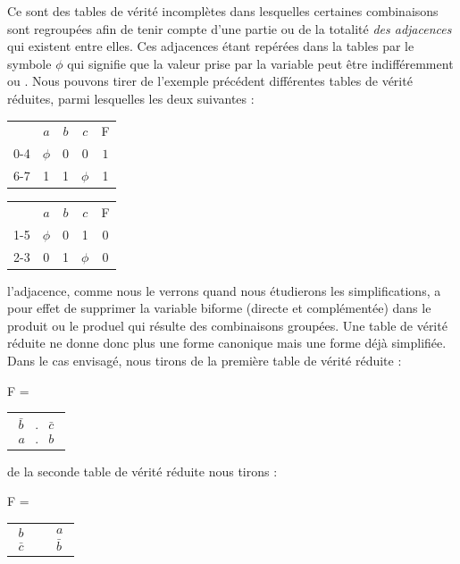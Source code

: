 \textendash{} Ce sont des tables de vérité incomplètes dans lesquelles
certaines combinaisons sont regroupées afin de tenir compte d'une
partie ou de la totalité \emph{des adjacences} qui existent entre
elles. Ces adjacences étant repérées dans la tables par le symbole
\og $\phi$ \fg{} qui signifie que la valeur prise par la variable
peut être indifféremment  \fg{} ou  \fg{}. Nous pouvons
tirer de l'exemple précédent différentes tables de vérité réduites,
parmi lesquelles les deux suivantes : 

\bigskip{}

\hspace*{1cm}%
\begin{tabular}{c|c|c|c||c|}
\cline{2-5} 
 & $a$ & $b$ & $c$ & F\tabularnewline
\cline{2-5} 
0-4 & $\phi$ & 0 & 0 & $1$\tabularnewline
6-7 & 1 & 1 & $\phi$ & 1\tabularnewline
\cline{2-5} 
\end{tabular}\hspace*{\fill}%
\begin{tabular}{c|c|c|c||c|}
\cline{2-5} 
 & $a$ & $b$ & $c$ & F\tabularnewline
\cline{2-5} 
1-5 & $\phi$ & 0 & 1 & 0\tabularnewline
2-3 & 0 & 1 & $\phi$ & 0\tabularnewline
\cline{2-5} 
\end{tabular}\hspace*{1cm}

\newpage 

l'adjacence, comme nous le verrons quand nous étudierons les simplifications,
a pour effet de supprimer la variable biforme (directe et complémentée)
dans le produit ou le produel qui résulte des combinaisons groupées.
Une table de vérité réduite ne donne donc plus une forme canonique
mais une forme déjà simplifiée. Dans le cas envisagé, nous tirons
de la première table de vérité réduite :

\bigskip{}

\begin{center}
F = %
\begin{tabular}{|c|}
$\begin{array}{ccc}
\bar{b} & . & \bar{c}\\
a & . & b
\end{array}$\tabularnewline
\end{tabular}
\end{center}

\bigskip{}

de la seconde table de vérité réduite nous tirons :

\begin{center}
F = %
\begin{tabular}{|c|c|}
$\begin{array}{c}
b\\
\bar{c}
\end{array}$ & $\begin{array}{c}
\end{array}$$\begin{array}{c}
a\\
\bar{b}
\end{array}$\tabularnewline
\end{tabular}
\end{center}

